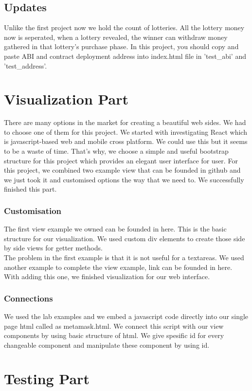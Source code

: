 \documentclass[]{scrreprt}
\begin{document}
	 \section{Updates}
	 	Unlike the first project now we hold the count of lotteries. All the lottery money now is seperated, when a lottery revealed, the winner can withdraw money gathered in that lottery's purchase phase. In this project, you should copy and paste ABI and contract deployment address into index.html file in 'test_abi' and 'test_address'.
	\chapter{Visualization Part}
		There are many options in the market for creating a beautiful web sides. We had to choose one of them for this project. We started with investigating React\cite{React} which is javascript-based web and mobile cross platform. We could use this but it seems to be a waste of time. That's why, we choose a simple and useful bootstrap structure for this project which provides an elegant user interface for user. For this project, we combined two example view that can be founded in github and we just took it and customised options the way that we need to. We successfully finished this part. 
		\subsection{Customisation}
		The first view example we owned can be founded in here\cite{1}. This is the basic structure for our visualization. We used custom div elements to create those side by side views for getter methods.\\
		The problem in the first example is that it is not useful for a textareas. We used another example to complete the view example, link can be founded in here\cite{2}. With adding this one, we finished visualization for our web interface.
		\subsection{Connections}
		We used the lab examples and we embed a javascript code directly into our single page html called as metamask.html. We connect this script with our view components by using basic structure of html. We give spesific id for every changeable component and manipulate these component by using id.
	\chapter{Testing Part}
\end{document}

